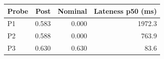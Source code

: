 \begin{tabular}{@{}lrrr@{}}\toprule
Probe & Post & Nominal & Lateness p50 (ms) \\
\midrule
P1 & 0.583 & 0.000 & 1972.3 \\
P2 & 0.588 & 0.000 & 763.9 \\
P3 & 0.630 & 0.630 & 83.6 \\
\bottomrule\end{tabular}
